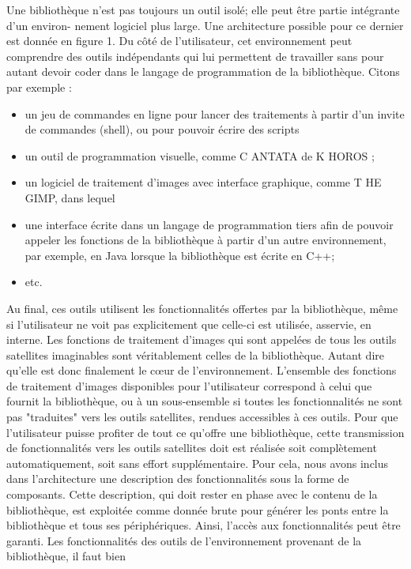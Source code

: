 Une bibliothèque n'est pas toujours un outil isolé; elle peut être partie intégrante d'un environ-
nement logiciel plus large. Une architecture possible pour ce dernier est donnée en figure 1.
Du côté de l'utilisateur, cet environnement peut comprendre des outils indépendants qui lui
permettent de travailler sans pour autant devoir coder dans le langage de programmation de la
bibliothèque. Citons par exemple :
\begin{itemize}
  \item un jeu de commandes en ligne pour lancer des traitements à partir d'un invite de commandes
        (shell), ou pour pouvoir écrire des scripts
  \item un outil de programmation visuelle, comme C ANTATA de K HOROS ;
  \item un logiciel de traitement d'images avec interface graphique, comme T HE GIMP, dans lequel
  \item une interface écrite dans un langage de programmation tiers afin de pouvoir appeler les
        fonctions de la bibliothèque à partir d'un autre environnement, par exemple, en Java lorsque la
        bibliothèque est écrite en C++;
  \item etc.
\end{itemize}
Au final, ces outils utilisent les fonctionnalités offertes par la bibliothèque, même si l'utilisateur
ne voit pas explicitement que celle-ci est utilisée, asservie, en interne. Les fonctions de traitement
d'images qui sont appelées de tous les outils satellites imaginables sont véritablement celles de la
bibliothèque. Autant dire qu'elle est donc finalement le cœur de l'environnement.
L'ensemble des fonctions de traitement d'images disponibles pour l'utilisateur correspond à
celui que fournit la bibliothèque, ou à un sous-ensemble si toutes les fonctionnalités ne sont pas
"traduites" vers les outils satellites, rendues accessibles à ces outils. Pour que l'utilisateur puisse
profiter de tout ce qu'offre une bibliothèque, cette transmission de fonctionnalités vers les outils
satellites doit est réalisée soit complètement automatiquement, soit sans effort supplémentaire.
Pour cela, nous avons inclus dans l'architecture une description des fonctionnalités sous la forme
de composants. Cette description, qui doit rester en phase avec le contenu de la bibliothèque, est
exploitée comme donnée brute pour générer les ponts entre la bibliothèque et tous ses périphériques.
Ainsi, l'accès aux fonctionnalités peut être garanti.
Les fonctionnalités des outils de l'environnement provenant de la bibliothèque, il faut bien
